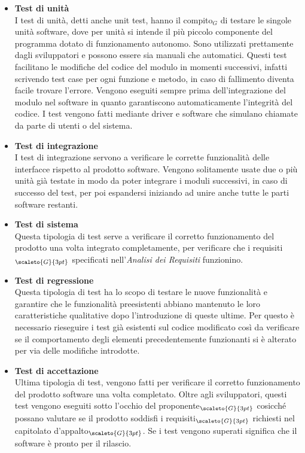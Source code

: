 \begin{itemize}
	\item[] \textbf{Test di unità} \\
		I test di unità, detti anche unit test, hanno il compito$_G$ di testare le singole unità software, dove per unità si intende il più piccolo componente del programma dotato di funzionamento autonomo.
		Sono utilizzati prettamente dagli sviluppatori e possono essere sia manuali che automatici.
		Questi test facilitano le modifiche del codice del modulo in momenti successivi, infatti scrivendo test case per ogni funzione e metodo, in caso di fallimento diventa facile trovare l’errore.
		Vengono eseguiti sempre prima dell’integrazione del modulo nel software in quanto garantiscono automaticamente l’integrità del codice.
		I test vengono fatti mediante driver e software che simulano chiamate da parte di utenti o del sistema.
	\item[] \textbf{Test di integrazione} \\
		I test di integrazione servono a verificare le corrette funzionalità delle interfacce rispetto al prodotto software.
		Vengono solitamente usate due o più unità già testate in modo da poter integrare i moduli successivi, in caso di successo del test, per poi espandersi iniziando ad unire anche tutte le parti software restanti.
	\item[] \textbf{Test di sistema} \\
		Questa tipologia di test serve a verificare il corretto funzionamento del prodotto una volta integrato completamente, per verificare che i requisiti$_{\scaleto{G}{3pt}}$ specificati nell’\textit{Analisi dei Requisiti} funzionino.
	\item[] \textbf{Test di regressione} \\
		Questa tipologia di test ha lo scopo di testare le nuove funzionalità e garantire che le funzionalità preesistenti abbiano mantenuto le loro caratteristiche qualitative dopo l’introduzione di queste ultime. Per questo è necessario rieseguire i test già esistenti sul codice modificato così da verificare se il comportamento degli elementi precedentemente funzionanti si è alterato per via delle modifiche introdotte.
	\item[] \textbf{Test di accettazione} \\
		Ultima tipologia di test, vengono fatti per verificare il corretto funzionamento del prodotto software una volta completato.
		Oltre agli sviluppatori, questi test vengono eseguiti sotto l’occhio del proponente$_{\scaleto{G}{3pt}}$ cosicché possano valutare se il prodotto soddisfi i requisiti$_{\scaleto{G}{3pt}}$ richiesti nel capitolato d’appalto$_{\scaleto{G}{3pt}}$.
		Se i test vengono superati significa che il software è pronto per il rilascio.
\end{itemize}

